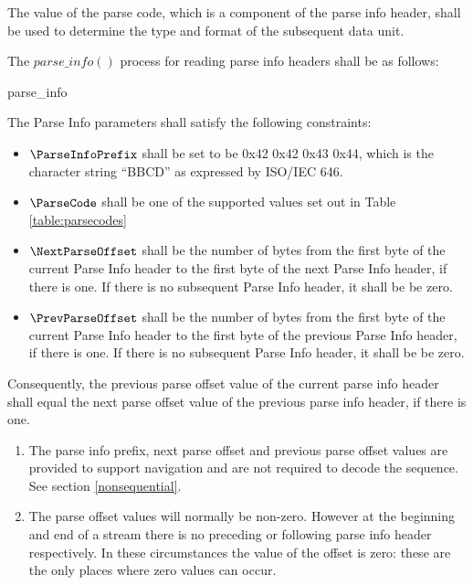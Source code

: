 The value of the parse code, which is a component of the parse info header,
shall be used to determine the type and format of the subsequent data unit.

The $parse\_info()$ process for reading parse info headers shall be as follows:

\begin{pseudo}{parse\_info}{}
\end{pseudo}

The Parse Info parameters shall satisfy the following constraints:

\begin{itemize}
\item $\ParseInfoPrefix$ shall be set to be 0x42 0x42 0x43 0x44, which is the character string ``BBCD'' as expressed by ISO/IEC 646.
\item $\ParseCode$ shall be one of the supported values set out 
in Table \ref{table:parsecodes}
\item $\NextParseOffset$ shall be the number of bytes from the first byte of the current
Parse Info header to the first byte of the next Parse Info header, 
if there is one. If there
is no subsequent Parse Info header, it shall be be zero.
\item $\PrevParseOffset$ shall be the number of bytes from the first byte of the current
Parse Info header to the first byte of the previous Parse Info header, 
if there is one. If there is no subsequent Parse Info header, it shall be be zero.
\end{itemize}

Consequently, the previous parse offset value of the current parse info header 
shall equal the next parse offset value of the previous parse info header, 
if there is one.

\begin{informative}
\begin{enumerate}
\item The parse info prefix, next parse offset and previous parse offset
values are provided to support navigation and are not required to decode
the sequence. See section \ref{nonsequential}.
\item The parse offset values will normally be non-zero. However at the beginning
and end of a stream there is no preceding or following parse info header respectively.
In these circumstances the value of the offset is zero: these are the only
places where zero values can occur.
\end{enumerate}
\end{informative}

